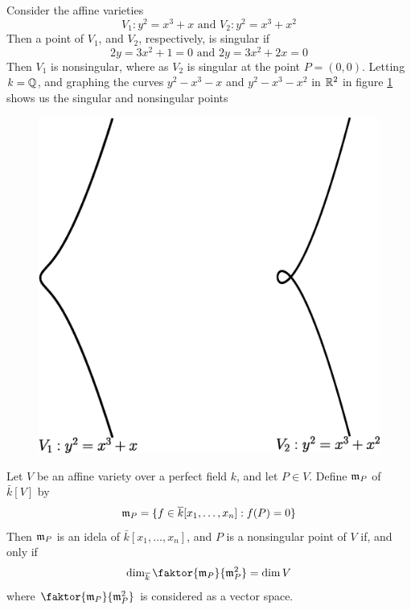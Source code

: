 \begin{example}\label{example_1.3}
    Consider the affine varieties
    \begin{equation*}
        V_1:y^2=x^3+x \text{ and } V_2:y^2=x^3+x^2
    \end{equation*}
    Then a point of $V_1$, and $V_2$, respectively, is singular if
    \begin{equation*}
        2y=3x^2+1=0 \text{ and } 2y=3x^2+2x=0
    \end{equation*}
    Then $V_1$ is nonsingular, where as $V_2$ is singular at the point
    $P=(0,0)$. Letting $k=\mathbb{Q}$, and graphing the curves $y^2-x^3-x$ and
    $y^2-x^3-x^2$ in $\mathbb{R}^2$ in figure \ref{figure_1.2} shows us the singular and
    nonsingular points
    \begin{figure}[h]
        \centering
        \includegraphics[scale=0.5]{Figures/Chapter1/nonsingular_singular.eps}
        \caption{}
        \label{figure_1.2}
    \end{figure}
\end{example}

\begin{lemma}\label{1.1.7}
    Let $V$ be an affine variety over a perfect field  $k$, and let  $P \in V$.
    Define $\mathfrak{m}_P$ of $\bar{k}[V]$ by
    \begin{equation*}
        \mathfrak{m}_P=\{f \in \overline{k}[x_1, \dots, x_n] : f(P)=0\}
    \end{equation*}
    Then $\mathfrak{m}_P$ is an idela of $\bar{k}[x_1, \dots, x_n]$, and $P$ is a
    nonsingular point of $V$ if, and only if
    \begin{equation*}
        \dim_{\bar{k}}{\faktor{\mf_P}{\mf_P^2}}=\dim{V}
    \end{equation*}
    where $\faktor{\mf_P}{\mf_P^2}$ is considered as a vector space.
\end{lemma}

